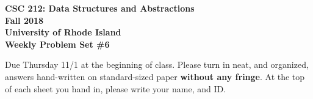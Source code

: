 \documentclass[11pt]{article}
\begin{document}
    \thispagestyle{empty}
    
    \begin{center}
        {\Large\bf CSC 212: Data Structures and Abstractions}\\
        \medskip
        {\Large\bf Fall 2018}\\
        \medskip
        {\Large\bf University of Rhode Island}\\
        \bigskip
        {\Large\bf Weekly Problem Set \#6}
    \end{center}
    
    Due Thursday 11/1 at the beginning of class. Please turn in neat, and organized, answers hand-written on standard-sized paper \textbf{without any fringe}. At the top of each sheet you hand in, please write your name, and ID.
    
\end{document}
